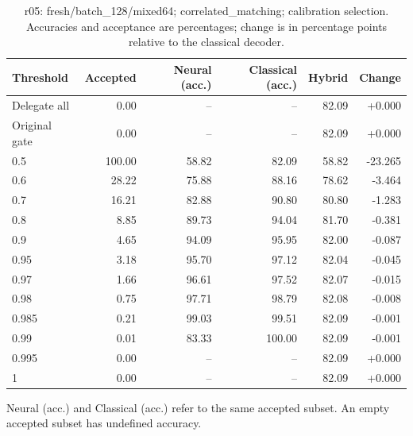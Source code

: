 \begin{table}[htbp]
\centering\small
\setlength{\tabcolsep}{3pt}
\caption{r05: fresh/batch\_128/mixed64; correlated\_matching; calibration selection. Accuracies and acceptance are percentages; change is in percentage points relative to the classical decoder.}
\begin{tabular}{lrrrrr}
\toprule
Threshold & Accepted & Neural (acc.) & Classical (acc.) & Hybrid & Change \\
\midrule
Delegate all & 0.00 & -- & -- & 82.09 & +0.000 \\
Original gate & 0.00 & -- & -- & 82.09 & +0.000 \\
0.5 & 100.00 & 58.82 & 82.09 & 58.82 & -23.265 \\
0.6 & 28.22 & 75.88 & 88.16 & 78.62 & -3.464 \\
0.7 & 16.21 & 82.88 & 90.80 & 80.80 & -1.283 \\
0.8 & 8.85 & 89.73 & 94.04 & 81.70 & -0.381 \\
0.9 & 4.65 & 94.09 & 95.95 & 82.00 & -0.087 \\
0.95 & 3.18 & 95.70 & 97.12 & 82.04 & -0.045 \\
0.97 & 1.66 & 96.61 & 97.52 & 82.07 & -0.015 \\
0.98 & 0.75 & 97.71 & 98.79 & 82.08 & -0.008 \\
0.985 & 0.21 & 99.03 & 99.51 & 82.09 & -0.001 \\
0.99 & 0.01 & 83.33 & 100.00 & 82.09 & -0.001 \\
0.995 & 0.00 & -- & -- & 82.09 & +0.000 \\
1 & 0.00 & -- & -- & 82.09 & +0.000 \\
\bottomrule
\end{tabular}
\par\smallskip\footnotesize Neural (acc.) and Classical (acc.) refer to the same accepted subset. An empty accepted subset has undefined accuracy.
\end{table}
